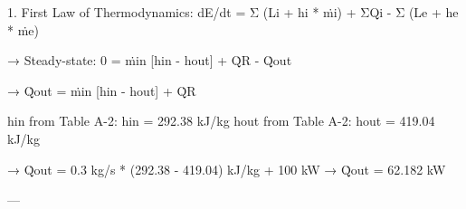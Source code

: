 1. First Law of Thermodynamics:  
dE/dt = Σ (Li + hi * ṁi) + ΣQi - Σ (Le + he * ṁe)  

→ Steady-state:  
0 = ṁin [hin - hout] + Q̇R - Q̇out  

→ Q̇out = ṁin [hin - hout] + Q̇R  

hin from Table A-2: hin = 292.38 kJ/kg  
hout from Table A-2: hout = 419.04 kJ/kg  

→ Q̇out = 0.3 kg/s * (292.38 - 419.04) kJ/kg + 100 kW  
→ Q̇out = 62.182 kW  

---